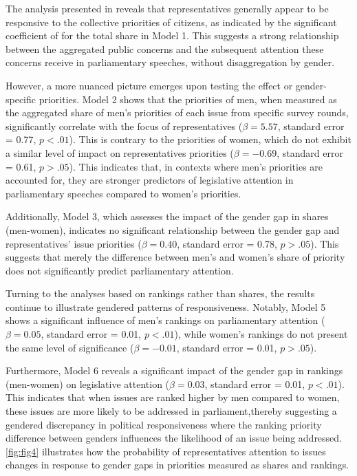 The analysis presented in reveals that representatives generally appear to be responsive to the collective priorities of citizens, as indicated by the significant coefficient of for the total share in Model 1. This suggests a strong relationship between the aggregated public concerns and the subsequent attention these concerns receive in parliamentary speeches, without disaggregation by gender.

However, a more nuanced picture emerges upon testing the effect or gender-specific priorities. Model 2 shows that the priorities of men, when measured as the aggregated share of men’s priorities of each issue from specific survey rounds, significantly correlate with the focus of representatives ($\beta = 5.57$, standard error = 0.77, $p < .01$). This is contrary to the priorities of women, which do not exhibit a similar level of impact on representatives priorities ($\beta = -0.69$, standard error = 0.61, $p > .05$). This indicates that, in contexts where men’s priorities are accounted for, they are stronger predictors of legislative attention in parliamentary speeches compared to women’s priorities.

Additionally, Model 3, which assesses the impact of the gender gap in shares (men-women), indicates no significant relationship between the gender gap and representatives’ issue priorities ($\beta = 0.40$, standard error = 0.78, $p > .05$). This suggests that merely the difference between men’s and women’s share of priority does not significantly predict parliamentary attention.

Turning to the analyses based on rankings rather than shares, the results continue to illustrate gendered patterns of responsiveness. Notably, Model 5 shows a significant influence of men’s rankings on parliamentary attention ($\beta = 0.05$, standard error = 0.01, $p < .01$), while women’s rankings do not present the same level of significance ($\beta = -0.01$, standard error = 0.01, $p > .05$).

Furthermore, Model 6 reveals a significant impact of the gender gap in rankings (men-women) on legislative attention ($\beta = 0.03$, standard error = 0.01, $p < .01$). This indicates that when issues are ranked higher by men compared to women, these issues are more likely to be addressed in parliament,thereby suggesting a gendered discrepancy in political responsiveness where the ranking priority difference between genders influences the likelihood of an issue being addressed. \cref{fig:fig4} illustrates how the probability of representatives attention to issues changes in response to gender gaps in priorities measured as shares and rankings.



